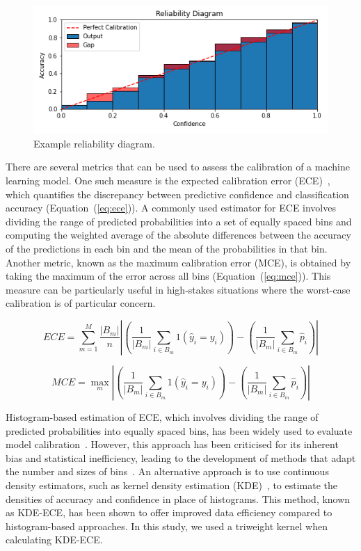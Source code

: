 \begin{figure}[h]
	\centering
	\includegraphics[width=\textwidth]{images/reliability_diagram.png}
	\caption{Example reliability diagram.}
	\label{fig:reliability_diagram}
\end{figure}

There are several metrics that can be used to assess the calibration of a machine learning model. One such measure is the expected calibration error (ECE)~\citep{guo2017calibration}, which quantifies the discrepancy between predictive confidence and classification accuracy (Equation~(\ref{eq:ece})). A commonly used estimator for ECE involves dividing the range of predicted probabilities into a set of equally spaced bins and computing the weighted average of the absolute differences between the accuracy of the predictions in each bin and the mean of the probabilities in that bin. Another metric, known as the maximum calibration error (MCE), is obtained by taking the maximum of the error across all bins (Equation~(\ref{eq:mce})). This measure can be particularly useful in high-stakes situations where the worst-case calibration is of particular concern.

\begin{equation}
	ECE=\sum_{m=1}^{M}\frac{\left|B_m\right|}{n}\left|\left(\frac{1}{\left|B_m\right|}\sum_{i\in B_m}1(\hat{y}_i=y_i)\right)-\left(\frac{1}{\left|B_m\right|}\sum_{i\in B_m}\hat{p}_i\right)\right|
	\label{eq:ece}
\end{equation}

\begin{equation}
	MCE = \max_m\left|\left(\frac{1}{\left|B_m\right|}\sum_{i\in B_m}1(\hat{y}_i=y_i)\right)-\left(\frac{1}{\left|B_m\right|}\sum_{i\in B_m}\hat{p}_i\right)\right|
	\label{eq:mce}
\end{equation}

Histogram-based estimation of ECE, which involves dividing the range of predicted probabilities into equally spaced bins, has been widely used to evaluate model calibration~\citep{muller2019does}. However, this approach has been criticised for its inherent bias and statistical inefficiency, leading to the development of methods that adapt the number and sizes of bins~\citep{roelofs2022mitigating}. An alternative approach is to use continuous density estimators, such as kernel density estimation (KDE)~\citep{parzen1962estimation}, to estimate the densities of accuracy and confidence in place of histograms. This method, known as KDE-ECE, has been shown to offer improved data efficiency compared to histogram-based approaches. In this study, we used a triweight kernel when calculating KDE-ECE.


